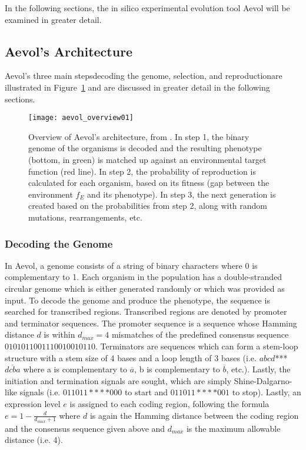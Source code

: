 In the following sections, the in silico experimental evolution tool Aevol will be examined in greater detail. 

\subsection{Aevol's Architecture}
Aevol's three main steps\textemdash decoding the genome, selection, and reproduction\textemdash are illustrated in Figure~\ref{fig:aevol_overview01} and are discussed in greater detail in the following sections. 

\begin{figure}[H]
	\texttt{[image: aevol\_overview01]}
	\centering
	\caption[Overview of Aevol's architecture.]{Overview of Aevol's architecture, from \cite{Batut.2013}. In step 1, the binary genome of the organisms is decoded and the resulting phenotype (bottom, in green) is matched up against an environmental target function (red line). In step 2, the probability of reproduction is calculated for each organism, based on its fitness (gap between the environment $f_E$ and its phenotype). In step 3, the next generation is created based on the probabilities from step 2, along with random mutations, rearrangements, etc.}
	\label{fig:aevol_overview01}
\end{figure}
\subsubsection{Decoding the Genome}\label{subsec:aevol_decoding}
In Aevol, a genome consists of a string of binary characters where 0 is complementary to 1. Each organism in the population has a double-stranded circular genome which is either generated randomly or which was provided as input. To decode the genome and produce the phenotype, the sequence is searched for transcribed regions. Transcribed regions are denoted by promoter and terminator sequences. The promoter sequence is a sequence whose Hamming distance $d$ is within $d_{max} = 4$ mismatches of the predefined consensus sequence $0101011001110010010110$. Terminators are sequences which can form a stem-loop structure with a stem size of 4 bases and a loop length of 3 bases (i.e. $abcd$***$\overline{dcba}$ where a is complementary to $\overline{a}$, b is complementary to $\overline{b}$, etc.). Lastly, the initiation and termination signals are sought, which are simply Shine-Dalgarno-like signals (i.e. $011011****000$ to start and $011011****001$ to stop). Lastly, an expression level $e$ is assigned to each coding region, following the formula $e = 1 - \frac{d}{d_{max} + 1}$ where $d$ is again the Hamming distance between the coding region and the consensus sequence given above and $d_{max}$ is the maximum allowable distance (i.e. 4). 

